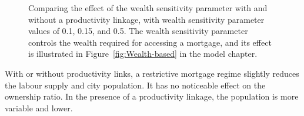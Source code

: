 \begin{figure}[h!tb]   %
\centering
{}
\caption[Wealth sensitivity parameter with and without linkage]{Comparing the effect of the wealth sensitivity parameter with and without a productivity linkage, with wealth sensitivity parameter values of 0.1, 0.15, and 0.5. The wealth sensitivity parameter controls the wealth required for accessing a mortgage, and its effect is illustrated in Figure~\ref{fig:Wealth-based} in the model chapter.}
\label{fig:Productivity_link_W-WO-wealth}
\end{figure}
With or without productivity links, a restrictive mortgage regime slightly reduces the labour supply and city population. It has no noticeable effect on the ownership ratio. In the presence of a productivity linkage, the population is more variable and lower. %

